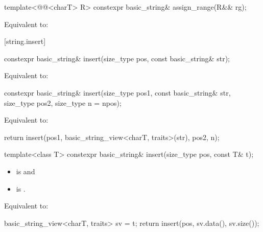 %
\begin{itemdecl}
template<@@<charT> R>
  constexpr basic_string& assign_range(R&& rg);
\end{itemdecl}

\begin{itemdescr}
\pnum
\effects
Equivalent to: 
\end{itemdescr}

[string.insert]{}

%
\begin{itemdecl}
constexpr basic_string& insert(size_type pos, const basic_string& str);
\end{itemdecl}

\begin{itemdescr}
\pnum
\effects
Equivalent to: 
\end{itemdescr}

%
\begin{itemdecl}
constexpr basic_string& insert(size_type pos1, const basic_string& str,
                               size_type pos2, size_type n = npos);
\end{itemdecl}

\begin{itemdescr}
\pnum
\effects
Equivalent to:
\begin{codeblock}
return insert(pos1, basic_string_view<charT, traits>(str), pos2, n);
\end{codeblock}
\end{itemdescr}

%
\begin{itemdecl}
template<class T>
  constexpr basic_string& insert(size_type pos, const T& t);
\end{itemdecl}

\begin{itemdescr}
\pnum
\constraints
\begin{itemize}
\item
{} is
 and
\item
{} is
.
\end{itemize}

\pnum
\effects
Equivalent to:
\begin{codeblock}
basic_string_view<charT, traits> sv = t;
return insert(pos, sv.data(), sv.size());
\end{codeblock}
\end{itemdescr}

